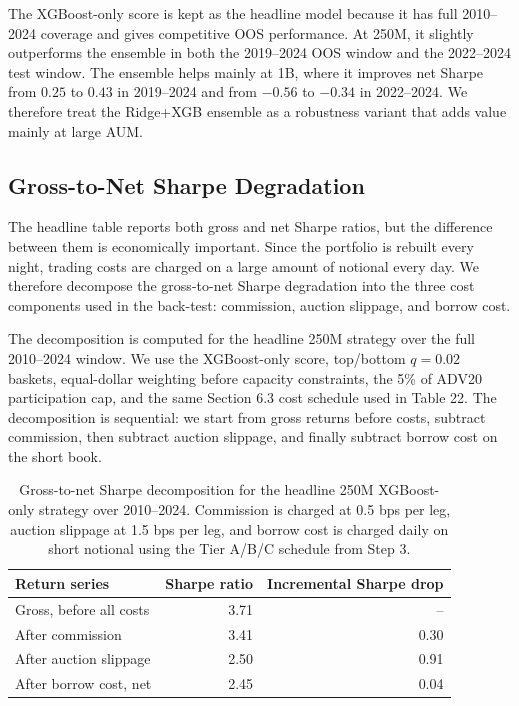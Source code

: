 \documentclass[12pt]{article}
\begin{document}
The XGBoost-only score is kept as the headline model 
because it has full 2010--2024 coverage and gives competitive OOS performance. At 250M, it slightly outperforms the ensemble in both the 2019--2024 OOS window and the 2022--2024 test window. The ensemble helps mainly at 1B, where it improves net Sharpe from $0.25$ to $0.43$ in 2019--2024 and from $-0.56$ to $-0.34$ in 2022--2024. We therefore treat the Ridge+XGB ensemble as a robustness variant that adds value mainly at large AUM.

\subsection{Gross-to-Net Sharpe Degradation}

The headline table reports both gross and net Sharpe ratios, but the difference between them is economically important. Since the portfolio is rebuilt every night, trading costs are charged on a large amount of notional every day. We therefore decompose the gross-to-net Sharpe degradation into the three cost components used in the back-test: commission, auction slippage, and borrow cost.

The decomposition is computed for the headline 250M strategy over the full 2010--2024 window. We use the XGBoost-only score, top/bottom \(q=0.02\) baskets, equal-dollar weighting before capacity constraints, the 5\% of ADV20 participation cap, and the same Section 6.3 cost schedule used in Table 22. The decomposition is sequential: we start from gross returns before costs, subtract commission, then subtract auction slippage, and finally subtract borrow cost on the short book.

\begin{table}[htbp]
\centering
\small
\begin{tabular}{lrr}
\hline
Return series & Sharpe ratio & Incremental Sharpe drop \\
\hline
Gross, before all costs & 3.71 & -- \\
After commission & 3.41 & 0.30 \\
After auction slippage & 2.50 & 0.91 \\
After borrow cost, net & 2.45 & 0.04 \\
\hline
\end{tabular}
\caption{Gross-to-net Sharpe decomposition for the headline 250M XGBoost-only strategy over 2010--2024. Commission is charged at 0.5 bps per leg, auction slippage at 1.5 bps per leg, and borrow cost is charged daily on short notional using the Tier A/B/C schedule from Step 3.}
\label{tab:stage5_cost_decomposition}
\end{table}
\end{document}
